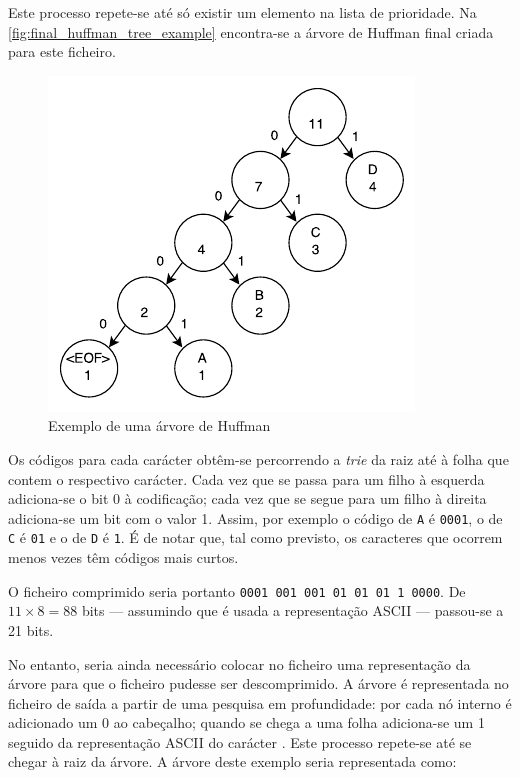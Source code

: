 Este processo repete-se até só existir um elemento na lista de prioridade. Na \autoref{fig:final_huffman_tree_example} encontra-se a árvore de Huffman final criada para este ficheiro.

\begin{figure}[H]
  \centering
  \includegraphics[width=.65\textwidth]{img/huffman_tree_example}
  \caption{Exemplo de uma árvore de Huffman}
  \label{fig:final_huffman_tree_example}
\end{figure}

Os códigos para cada carácter obtêm-se percorrendo a \textit{trie} da raiz até à folha que contem o respectivo carácter. Cada vez que se passa para um filho à esquerda adiciona-se o bit 0 à codificação; cada vez que se segue para um filho à direita adiciona-se um bit com o valor 1. Assim, por exemplo o código de \texttt{A} é \texttt{0001}, o de \texttt{C} é \texttt{01} e o de \texttt{D} é \texttt{1}. É de notar que, tal como previsto, os caracteres que ocorrem menos vezes têm códigos mais curtos.

O ficheiro comprimido seria portanto \texttt{0001 001 001 01 01 01 1 0000}. De $11 \times 8 = 88$ bits --- assumindo que é usada a representação ASCII --- passou-se a 21 bits.

No entanto, seria ainda necessário colocar no ficheiro uma representação da árvore para que o ficheiro pudesse ser descomprimido. A árvore é representada no ficheiro de saída a partir de uma pesquisa em profundidade: por cada nó interno é adicionado um 0 ao cabeçalho; quando se chega a uma folha adiciona-se um 1 seguido da representação ASCII do carácter \cite{crochemore:hal-00469994}. Este processo repete-se até se chegar à raiz da árvore. A árvore deste exemplo seria representada como: \\[5mm]
 \par
\vspace{5mm}

